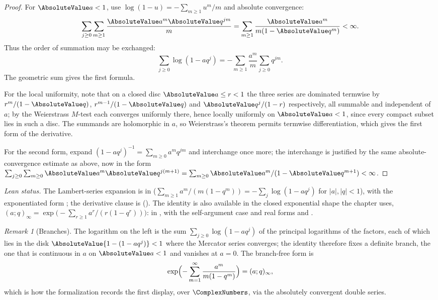 \documentclass[11pt,a4paper,oneside,openany]{book}
\theoremstyle{definition}
\theoremstyle{remark}
\newtheorem{remark}[remark]{Remark}
\begin{document}
\begin{proof}
For $\AbsoluteValue a<1$, use $\log(1-u)=-\sum_{m\ge1}u^m/m$ and absolute convergence:
\[
 \sum_{j\ge0}\sum_{m\ge1}\frac{\AbsoluteValue a^m\AbsoluteValue q^{jm}}{m}
 =\sum_{m\ge1}\frac{\AbsoluteValue a^m}{m(1-\AbsoluteValue q^m)}<\infty.
\]
Thus the order of summation may be exchanged:
\[
 \sum_{j\ge0}\log(1-aq^j)
 =-\sum_{m\ge1}\frac{a^m}{m}\sum_{j\ge0}q^{jm}.
\]
The geometric sum gives the first formula.

For the local uniformity, note that on a closed disc $\AbsoluteValue a\le r<1$ the three series
are dominated termwise by $r^{m}/(1-\AbsoluteValue q)$, $r^{m-1}/(1-\AbsoluteValue q)$ and
$\AbsoluteValue q^{j}/(1-r)$ respectively, all summable and independent of $a$; by the
Weierstrass $M$-test each converges uniformly there, hence locally uniformly on
$\AbsoluteValue a<1$, since every compact subset lies in such a disc.  The summands are
holomorphic in $a$, so Weierstrass's theorem permits termwise differentiation, which gives the
first form of the derivative.

For the second form, expand $(1-aq^j)^{-1}=\sum_{m\ge0}a^mq^{jm}$ and interchange once more; the
interchange is justified by the same absolute-convergence estimate as above, now in the form
$\sum_{j\ge0}\sum_{m\ge0}\AbsoluteValue a^m\AbsoluteValue q^{j(m+1)}
 =\sum_{m\ge0}\AbsoluteValue a^m/(1-\AbsoluteValue q^{m+1})<\infty$.
\end{proof}

\emph{Lean status.}  The Lambert-series expansion is
 in 
($\sum_{m\ge1}a^m/(m(1-q^m))=-\sum_j\log(1-aq^j)$ for $|a|,|q|<1$), with the exponentiated
form ; the derivative clause is
 ().
The identity is also available in the closed exponential shape the chapter uses,
\((a;q)_\infty=\exp\bigl(-\sum_{r\ge1}a^{r}/(r(1-q^{r}))\bigr)\):
 in , with the
self-argument case  and real forms
 and
.


\begin{remark}[Branches]\label{rem:lambert-log-branch}
The logarithm on the left is the sum $\sum_{j\ge0}\log(1-aq^j)$ of the principal logarithms of the factors, each of which lies in the disk $\AbsoluteValue{1-(1-aq^j)}<1$ where the Mercator series converges; the identity therefore fixes a definite branch, the one that is continuous in $a$ on $\AbsoluteValue a<1$ and vanishes at $a=0$.  The branch-free form is
\[
 \exp\Bigl(-\sum_{m=1}^{\infty}\frac{a^m}{m(1-q^m)}\Bigr)=(a;q)_\infty,
\]
which is how the formalization records the first display, over $\ComplexNumbers$, via the absolutely convergent double series.
\end{remark}
\end{document}
